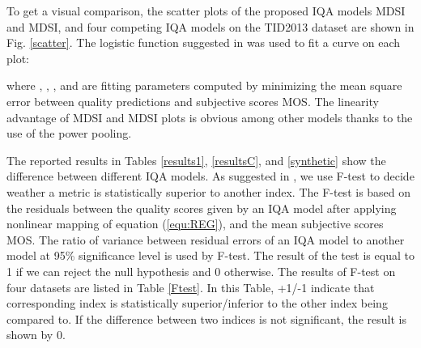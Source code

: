 To get a visual comparison, the scatter plots of the proposed IQA models MDSI and MDSI, and four competing IQA models on the TID2013 dataset are shown in Fig. \ref{scatter}. The logistic function suggested in \cite{statistical2006} was used to fit a curve on each plot:
                    
where , , ,  and  are fitting parameters computed by minimizing the mean square error between quality predictions  and subjective scores MOS. The linearity advantage of MDSI and MDSI plots is obvious among other models thanks to the use of the power pooling. 









The reported results in Tables \ref{results1}, \ref{resultsC}, and \ref{synthetic} show the difference between different IQA models. As suggested in \cite{LIVE}, we use F-test to decide weather a metric is statistically superior to another index. The F-test is based on the residuals between the quality scores given by an IQA model after applying nonlinear mapping of equation (\ref{equ:REG}), and the mean subjective scores MOS. The ratio of variance between residual errors of an IQA model to another model at 95\% significance level is used by F-test. The result of the test is equal to 1 if we can reject the null hypothesis and 0 otherwise. The results of F-test on four datasets are listed in Table \ref{Ftest}. In this Table, +1/-1 indicate that corresponding index is statistically superior/inferior to the other index being compared to. If the difference between two indices is not significant, the result is shown by 0. 











